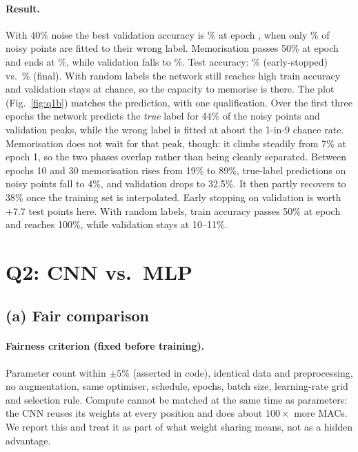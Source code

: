 \documentclass[10pt,twocolumn,a4paper]{article}
\begin{document}
\paragraph{Result.} With 40\% noise the best validation accuracy is \QbNFortyBestVal\% at epoch
\QbNFortyBestEp, when only \QbNFortyMemAtBest\% of noisy points are fitted to their wrong label.
Memorisation passes 50\% at epoch \QbNFortyEpMemFifty{} and ends at \QbNFortyMemFinal\%, while
validation falls to \QbNFortyFinalVal\%. Test accuracy: \QbNFortyTestBest\% (early-stopped) vs.\
\QbNFortyTestFinal\% (final). With random labels the network still reaches high train accuracy and
validation stays at chance, so the capacity to memorise is there.
The plot (Fig.~\ref{fig:q1b}) matches the prediction, with one qualification. Over the first three
epochs the network predicts the \emph{true} label for 44\% of the noisy points and validation
peaks, while the wrong label is fitted at about the 1-in-9 chance rate. Memorisation does not wait
for that peak, though: it climbs steadily from 7\% at epoch 1, so the two phases overlap rather than
being cleanly separated. Between epochs 10 and 30 memorisation rises from 19\% to 89\%, true-label
predictions on noisy points fall to 4\%, and validation drops to 32.5\%. It then partly recovers to
38\% once the training set is interpolated. Early stopping on validation is worth
$+7.7$ test points here. With random labels, train accuracy passes 50\% at epoch
\QbNFullEpMemFifty{} and reaches 100\%, while validation stays at 10--11\%.

\section{Q2: CNN vs.\ MLP}
\subsection{(a) Fair comparison}
\paragraph{Fairness criterion (fixed before training).} Parameter count within $\pm5\%$ (asserted
in code), identical data and preprocessing, no augmentation, same optimiser, schedule, epochs,
batch size, learning-rate grid and selection rule. Compute cannot be matched at the same time as
parameters: the CNN reuses its weights at every position and does about $100\times$ more MACs.
We report this and treat it as part of what weight sharing means, not as a hidden advantage.
\end{document}
